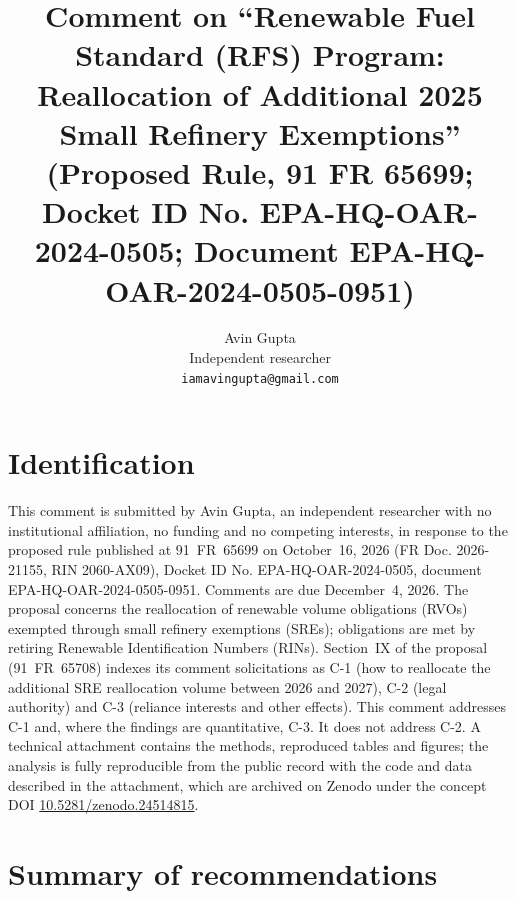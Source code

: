 \documentclass[11pt]{article}
\title{Comment on ``Renewable Fuel Standard (RFS) Program: Reallocation of Additional 2025 Small Refinery Exemptions'' (Proposed Rule, 91 FR 65699; Docket ID No. EPA-HQ-OAR-2024-0505; Document EPA-HQ-OAR-2024-0505-0951)}
\author{Avin Gupta \\ Independent researcher \\ \texttt{iamavingupta@gmail.com}}
\date{\commentdate}
\begin{document}
\maketitle

\section{Identification}

This comment is submitted by Avin Gupta, an independent researcher with no institutional affiliation, no funding and no competing interests, in response to the proposed rule published at 91~FR~65699 on October~16, 2026 (FR Doc. 2026-21155, RIN 2060-AX09), Docket ID No. EPA-HQ-OAR-2024-0505, document EPA-HQ-OAR-2024-0505-0951. Comments are due December~4, 2026. The proposal concerns the reallocation of renewable volume obligations (RVOs) exempted through small refinery exemptions (SREs); obligations are met by retiring Renewable Identification Numbers (RINs). Section~IX of the proposal (91~FR~65708) indexes its comment solicitations as C-1 (how to reallocate the additional SRE reallocation volume between 2026 and 2027), C-2 (legal authority) and C-3 (reliance interests and other effects). This comment addresses C-1 and, where the findings are quantitative, C-3. It does not address C-2. A technical attachment contains the methods, reproduced tables and figures; the analysis is fully reproducible from the public record with the code and data described in the attachment, which are archived on Zenodo under the concept DOI \href{https://doi.org/10.5281/zenodo.24514815}{10.5281/zenodo.24514815}.

\section{Summary of recommendations}
\end{document}
